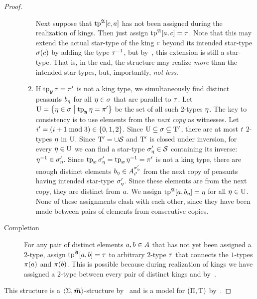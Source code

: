 \begin{proof}
\begin{description}
\begin{enumerate}
    Next suppose that $\operatorname{tp}^{\mathfrak{A}}[c,a]$ has not been assigned during the
    realization of kings. Then just assign $\operatorname{tp}^{\mathfrak{A}}[a,c] = \tau$.
    Note that this may extend the actual star-type of the king $c$ beyond its
    intended star-type $\sigma(c)$ by adding the type $\tau^{-1}$, but
    by~, this extension is still a star-type. That is,
    in the end, the structure may realize \emph{more} than the intended
    star-types, but, importantly, \emph{not less}.
    \item If $\operatorname{tp}_{\bm{y}}\tau = {\pi'}$ is not a king type, we simultaneously find
    distinct peasants $b_{\eta}$ for all $\eta \in \sigma$ that are parallel to
    $\tau$.
    Let $\mathrm{U} = \left\{\eta \in \sigma\mathrel{}\middle|\mathrel{}\operatorname{tp}_{\bm{y}}\eta = {\pi'}\right\}$ be the set of
    all such $2$-types $\eta$.
    The key to consistency is to use elements from the \emph{next copy} as
    witnesses. Let ${i'} = (i+1 \bmod 3) \in \left\{0,1,2\right\}$. Since $\mathrm{U}
    \subseteq \sigma \subseteq {\mathrm{T}'}$, there are at most $t$ $2$-types $\eta$ in $\mathrm{U}$. Since ${\mathrm{T}'} = \cup\mathcal{S}$ and ${\mathrm{T}'}$ is
    closed under inversion, for every $\eta \in \mathrm{U}$ we can find a star-type
    ${\sigma_{\eta}'} \in \mathcal{S}$ containing its inverse: $\eta^{-1} \in
    {\sigma_{\eta}'}$. Since $\operatorname{tp}_{\bm{x}}{\sigma_{\eta}'} = \operatorname{tp}_{\bm{x}}\eta^{-1} = {\pi'}$ is not
    a king type, there are enough distinct elements $b_{\eta} \in
    A^{{\sigma_{\eta}'}}_{{i'}}$ from the next copy of peasants having intended
    star-type ${\sigma_{\eta}'}$. Since these elements are from the next copy, they
    are distinct from $a$.
    We assign $\operatorname{tp}^{\mathfrak{A}}[a,b_{\eta}] = \eta$ for all $\eta \in \mathrm{U}$.
    None of these assignments clash with each other, since they have been made
    between pairs of elements from consecutive copies.
  \end{enumerate}
  \item[Completion] For any pair of distinct elements $a, b \in A$ that
  has not yet been assigned a $2$-type, assign $\operatorname{tp}^{\mathfrak{A}}[a,b] = \tau$ to
  arbitrary $2$-type $\tau$ that connects the $1$-types $\pi(a)$ and
  $\pi(b)$. This is possible because during realization of kings we have
  assigned a $2$-type between every pair of distinct kings and by~.
\end{description}
This structure is a $\left\langle \mathrm{\Sigma},\bar{\bm{m}} \right\rangle$-structure by~ and
is a model for $(\Pi,\mathrm{T})$ by~.
\end{proof}


